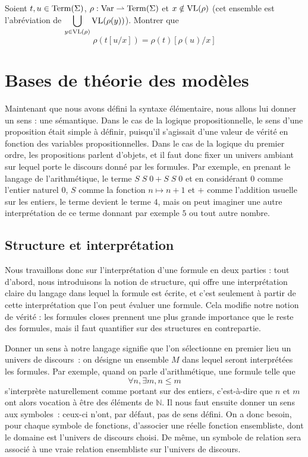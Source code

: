 \begin{exercise}
  Soient $t,u\in\operatorname{Term}(\Sigma)$, $\rho : \operatorname{Var} \rightharpoonup \operatorname{Term}(\Sigma)$ et
  $x \notin \operatorname{VL}(\rho)$ (cet ensemble est l'abréviation de
  $\displaystyle\bigcup_{y \in \operatorname{VL}(\rho)} \operatorname{VL}(\rho(y))$). Montrer que
  \[\rho(t[u/x]) = \rho(t)[\rho(u)/x]\]
\end{exercise}

\section{Bases de théorie des modèles}

Maintenant que nous avons défini la syntaxe élémentaire, nous allons lui donner
un sens : une sémantique. Dans le cas de la logique propositionnelle, le sens
d'une proposition était simple à définir, puisqu'il s'agissait d'une valeur de
vérité en fonction des variables propositionnelles. Dans le cas de la logique du
premier ordre, les propositions parlent d'objets, et il faut donc fixer un
univers ambiant sur lequel porte le discours donné par les formules. Par
exemple, en prenant le langage de l'arithmétique, le terme $S\;S\;0 + S\;S\;0$
et en considérant $0$ comme l'entier naturel $0$, $S$ comme la fonction
$n \mapsto n + 1$ et $+$ comme l'addition usuelle sur les entiers, le terme
devient le terme $4$, mais on peut imaginer une autre interprétation de ce terme
donnant par exemple $5$ ou tout autre nombre.

\subsection{Structure et interprétation}

Nous travaillons donc sur l'interprétation d'une formule en deux parties : tout
d'abord, nous introduisons la notion de structure, qui offre une interprétation
claire du langage dans lequel la formule est écrite, et c'est seulement à partir
de cette interprétation que l'on peut évaluer une formule. Cela modifie notre
notion de vérité : les formules closes prennent une plus grande importance que
le reste des formules, mais il faut quantifier sur des structures en
contrepartie.

Donner un sens à notre langage signifie que l'on sélectionne en premier lieu un
univers de discours~: on désigne un ensemble $M$ dans lequel seront interprétées
les formules. Par exemple, quand on parle d'arithmétique, une formule telle que
\[\forall n,\exists m, n \leq m\]
s'interprète naturellement comme portant sur des entiers, c'est-à-dire que $n$
et $m$ ont alors vocation à être des éléments de $\mathbb N$. Il nous faut
ensuite donner un sens aux symboles~: ceux-ci n'ont, par défaut, pas de sens
défini. On a donc besoin, pour chaque symbole de fonctions, d'associer une
réelle fonction ensembliste, dont le domaine est l'univers de discours choisi.
De même, un symbole de relation sera associé à une vraie relation ensembliste
sur l'univers de discours.

